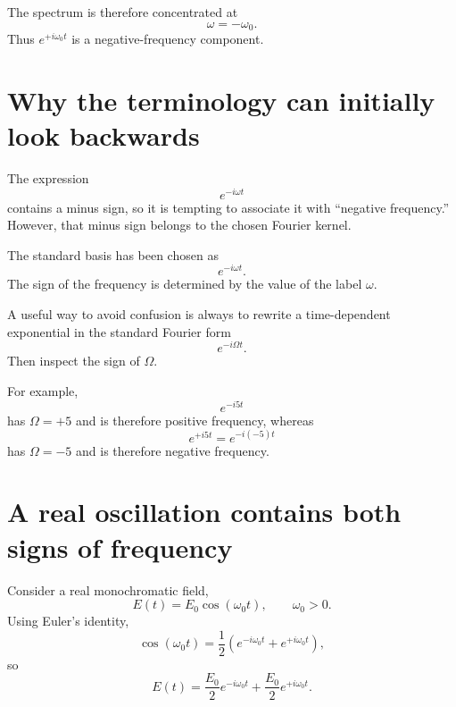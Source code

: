 \documentclass[11pt]{article}
\begin{document}
The spectrum is therefore concentrated at
\begin{equation}
\omega=-\omega_0.
\end{equation}
Thus $e^{+i\omega_0t}$ is a negative-frequency component.

\section{Why the terminology can initially look backwards}

The expression
\begin{equation}
e^{-i\omega t}
\end{equation}
contains a minus sign, so it is tempting to associate it with ``negative frequency.'' However, that minus sign belongs to the chosen Fourier kernel.

The standard basis has been chosen as
\begin{equation}
e^{-i\omega t}.
\end{equation}
The sign of the frequency is determined by the value of the label $\omega$.

A useful way to avoid confusion is always to rewrite a time-dependent exponential in the standard Fourier form
\begin{equation}
e^{-i\Omega t}.
\label{eq:standard-form}
\end{equation}
Then inspect the sign of $\Omega$.

For example,
\begin{equation}
e^{-i5t}
\end{equation}
has $\Omega=+5$ and is therefore positive frequency, whereas
\begin{equation}
e^{+i5t}
=
e^{-i(-5)t}
\end{equation}
has $\Omega=-5$ and is therefore negative frequency.

\section{A real oscillation contains both signs of frequency}

Consider a real monochromatic field,
\begin{equation}
E(t)=E_0\cos(\omega_0t),
\qquad
\omega_0>0.
\label{eq:real-field}
\end{equation}
Using Euler's identity,
\begin{equation}
\cos(\omega_0t)
=
\frac{1}{2}
\left(
e^{-i\omega_0t}
+
e^{+i\omega_0t}
\right),
\label{eq:cos-decomposition}
\end{equation}
so
\begin{equation}
E(t)
=
\frac{E_0}{2}e^{-i\omega_0t}
+
\frac{E_0}{2}e^{+i\omega_0t}.
\end{equation}
\end{document}
